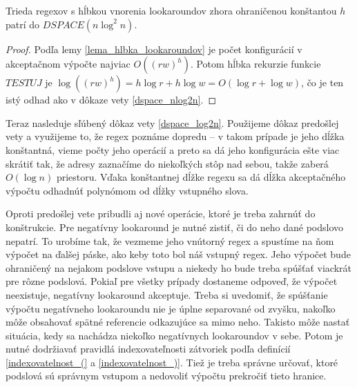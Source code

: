 \begin{dosledok}
Trieda regexov s hĺbkou vnorenia lookaroundov zhora ohraničenou konštantou $h$ patrí do $DSPACE(n\log^2 n)$.
\end{dosledok}
\begin{proof}
Podľa lemy \ref{lema_hlbka_lookaroundov} je počet konfigurácií v akceptačnom výpočte najviac $O((rw)^h)$. Potom hĺbka rekurzie funkcie $TESTUJ$ je $\log((rw)^h) = h\log r + h\log w = O(\log r+\log w)$, čo je ten istý odhad ako v dôkaze vety \ref{dspace_nlog2n}.
\end{proof}

Teraz nasleduje sľúbený dôkaz vety \ref{dspace_log2n}. Použijeme dôkaz predošlej vety a využijeme to, že regex poznáme dopredu -- v takom prípade je jeho dĺžka konštantná, vieme počty jeho operácií a preto sa dá jeho konfigurácia ešte viac skrátiť tak, že adresy zaznačíme do niekoľkých stôp nad sebou, takže zaberá $O(\log n)$ priestoru. Vďaka konštantnej dĺžke regexu sa dá dĺžka akceptačného výpočtu odhadnúť polynómom od dĺžky vstupného slova.

Oproti predošlej vete pribudli aj nové operácie, ktoré je treba zahrnúť do konštrukcie. Pre negatívny lookaround je nutné zistiť, či do neho dané podslovo nepatrí. To urobíme tak, že vezmeme jeho vnútorný regex a spustíme na ňom výpočet na ďalšej páske, ako keby toto bol náš vstupný regex. Jeho výpočet bude ohraničený na nejakom podslove vstupu a niekedy ho bude treba spúšťať viackrát pre rôzne podslová. Pokiaľ pre všetky prípady dostaneme odpoveď, že výpočet neexistuje, negatívny lookaround akceptuje. Treba si uvedomiť, že spúšťanie výpočtu negatívneho lookaroundu nie je úplne separované od zvyšku, nakoľko môže obsahovať spätné referencie odkazujúce sa mimo neho. Takisto môže nastať situácia, kedy sa nachádza niekoľko negatívnych lookaroundov v sebe. Potom je nutné dodržiavať pravidlá indexovateľnosti zátvoriek podľa definícií \ref{indexovatelnost_(} a \ref{indexovatelnost_)}. Tiež je treba správne určovať, ktoré podslová sú správnym vstupom a nedovoliť výpočtu prekročiť tieto hranice.

